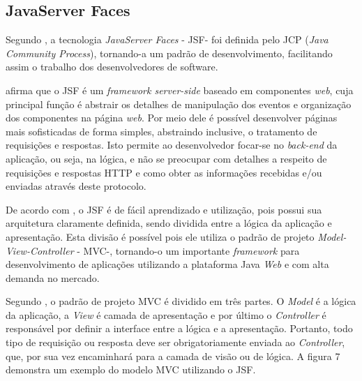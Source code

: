 \subsection{JavaServer Faces}

\par Segundo , a tecnologia \textit{JavaServer Faces} - JSF\footnotemark[17] - foi definida pelo JCP (\textit{Java Community Process}), tornando-a um padrão de desenvolvimento, facilitando assim o trabalho dos desenvolvedores de software.


\par {} afirma que o JSF é um \textit{framework server-side} baseado em componentes \textit{web}, cuja principal função é abstrair os detalhes de manipulação dos eventos e organização dos componentes na página \textit{web}. Por meio dele é possível desenvolver páginas mais sofisticadas de forma simples, abstraindo inclusive, o tratamento de requisições e respostas. Isto permite ao desenvolvedor focar-se no \textit{back-end} da aplicação, ou seja, na lógica, e não se preocupar com detalhes a respeito de requisições e respostas HTTP e como obter as informações recebidas e/ou enviadas através deste protocolo.

\par De acordo com , o JSF é de fácil aprendizado e utilização, pois possui sua arquitetura claramente definida, sendo dividida entre a lógica da aplicação e apresentação. Esta divisão é possível pois ele utiliza o padrão de projeto \textit{Model-View-Controller} - MVC\footnotemark[18] -, tornando-o um importante \textit{framework} para desenvolvimento de aplicações utilizando a plataforma Java \textit{Web} e com alta demanda no mercado.


\par Segundo , o padrão de projeto MVC é dividido em três partes. O \textit{Model} é a lógica da aplicação, a \textit{View} é camada de apresentação e por último o \textit{Controller} é responsável por definir a interface entre a lógica e a apresentação. Portanto, todo tipo de requisição ou resposta deve ser obrigatoriamente enviada ao \textit{Controller}, que, por sua vez encaminhará para a camada de visão ou de lógica. A figura 7 demonstra um exemplo do modelo MVC utilizando o JSF.

